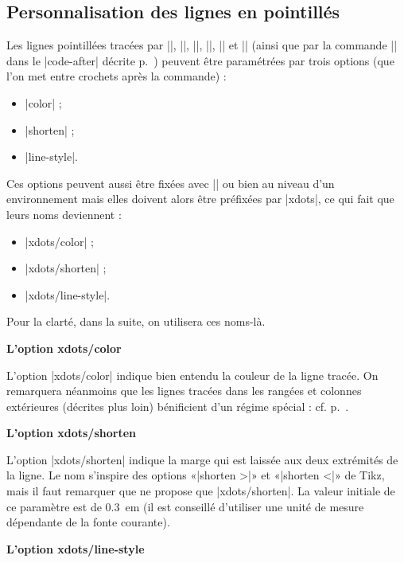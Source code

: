 \documentclass[dvipsnames]{article}%
\begin{document}
\subsection{Personnalisation des lignes en pointillés}


\label{customization}
Les lignes pointillées tracées par |\Ldots|, |\Cdots|, |\Vdots|, |\Ddots|,
|\Iddots| et |\Hdotsfor| (ainsi que par la commande |\line| dans le |code-after|
décrite p.~\pageref{line-in-code-after}) peuvent être paramétrées par trois
options (que l'on met entre crochets après la commande) :
%
\begin{itemize}
\item |color| ;
\item |shorten| ; 
\item |line-style|.
\end{itemize}

Ces options peuvent aussi être fixées avec |\NiceMatrixOptions| ou bien au
niveau d'un environnement mais elles doivent alors être préfixées par |xdots|,
ce qui fait que leurs noms deviennent :
%
\begin{itemize}
\item |xdots/color| ;
\item |xdots/shorten| ; 
\item |xdots/line-style|.
\end{itemize}
%
Pour la clarté, dans la suite, on utilisera ces noms-là.

\bigskip
\textbf{L'option xdots/color}\par\nobreak

\smallskip
L'option |xdots/color| indique bien entendu la couleur de la ligne tracée. On
remarquera néanmoins que les lignes tracées dans les rangées et colonnes
extérieures (décrites plus loin) bénificient d'un régime spécial : cf.
p.~\pageref{exterior}.


\bigskip
\textbf{L'option xdots/shorten}\par\nobreak

\smallskip
L'option |xdots/shorten| indique la marge qui est laissée aux deux extrémités de
la ligne. Le nom s'inspire des options «|shorten >|» et «|shorten <|» de Tikz,
mais il faut remarquer que  ne propose que |xdots/shorten|. La
valeur initiale de ce paramètre est de $0.3$~em (il est conseillé d'utiliser une
unité de mesure dépendante de la fonte courante).


\bigskip
\textbf{L'option xdots/line-style}\par\nobreak
\end{document}
